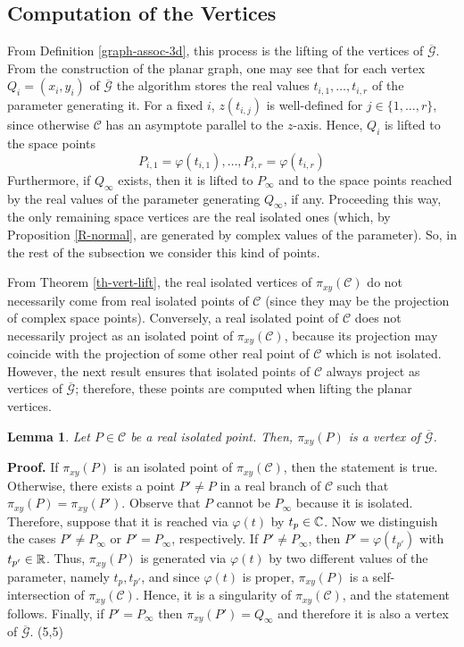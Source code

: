 \documentclass{elsart}
\def\qed{\hfill  \framebox(5,5){}}
\newtheorem{lemma}[theorem]{{\bf Lemma}}
\begin{document}
\subsection{Computation of the Vertices}\label{vertices-3d}
From Definition \ref{graph-assoc-3d}, this process is the lifting of the vertices of
$\overline{\mathcal G}$. From the construction of the planar
graph, one may see that for each vertex $Q_i=(x_i,y_i)$ of
$\overline{\mathcal G}$ the algorithm stores the real values
$t_{i,1},\ldots,t_{i,r}$ of the parameter generating it. For a
fixed $i$, $z(t_{i,j})$ is well-defined for $j\in \{1,\ldots,r\}$,
since otherwise ${\mathcal C}$ has an asymptote parallel to the
$z$-axis. Hence, $Q_i$ is lifted to the space points
\[P_{i,1}=\varphi(t_{i,1}),\ldots,P_{i,r}=\varphi(t_{i,r})\] Furthermore, if $Q_{\infty}$ exists, then it is lifted to $P_{\infty}$ and to the space points reached by
the real values of the parameter generating $Q_{\infty}$, if any. Proceeding this way, the only remaining
space vertices are the real isolated ones (which, by Proposition \ref{R-normal}, are generated
by complex values of the parameter). So, in the rest of the subsection we consider this kind of points.

From Theorem \ref{th-vert-lift}, the real isolated vertices of
$\pi_{xy}({\mathcal C})$ do not necessarily come from real
isolated points of ${\mathcal C}$ (since they may be the
projection of complex space points). Conversely, a real isolated
point of ${\mathcal C}$ does not necessarily project as an
isolated point of $\pi_{xy}({\mathcal C})$, because its projection
may coincide with the projection of some other real point of
${\mathcal C}$ which is not isolated. However, the next result
ensures that isolated points of ${\mathcal C}$ always project as
vertices of $\overline{\mathcal G}$; therefore, these points are
computed when lifting the planar vertices.

\begin{lemma} \label{lemma-isol}
Let $P\in {\mathcal C}$ be a real isolated point. Then, $\pi_{xy}(P)$ is a vertex of $\overline{\mathcal G}$.
\end{lemma}

{\bf Proof.} If $\pi_{xy}(P)$ is an isolated point of
$\pi_{xy}({\mathcal C})$, then the statement is true. Otherwise,
there exists a point $P'\neq P$ in a real branch of ${\mathcal C}$
such that $\pi_{xy}(P)=\pi_{xy}(P')$. Observe that $P$ cannot be
$P_{\infty}$ because it is isolated. Therefore, suppose that  it
is reached via $\varphi(t)$ by $t_p\in {\Bbb C}$. Now we
distinguish the cases $P'\neq P_{\infty}$ or $P'= P_{\infty}$,
respectively. If $P'\neq P_{\infty}$, then $P'=\varphi(t_{p'})$
with $t_{p'}\in {\Bbb R}$. Thus, $\pi_{xy}(P)$ is generated via
$\varphi(t)$ by two different values of the parameter, namely
$t_p,t_{p'}$, and since $\varphi(t)$ is proper, $\pi_{xy}(P)$ is a
self-intersection of $\pi_{xy}({\mathcal C})$. Hence, it is a
singularity of $\pi_{xy}({\mathcal C})$, and the statement
follows. Finally, if $P'= P_{\infty}$ then
$\pi_{xy}(P')=Q_{\infty}$ and therefore it is also a vertex of
$\overline{\mathcal G}$. \qed
\end{document}
